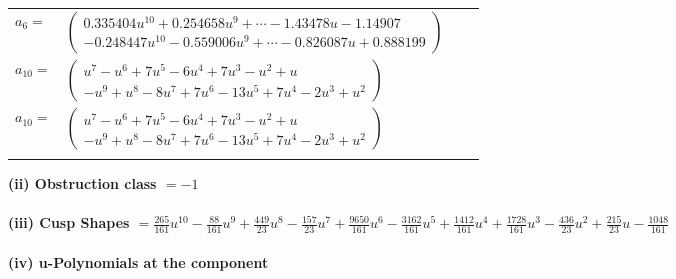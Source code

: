 \documentclass[1p]{elsarticle_modified}
\theoremstyle{definition}
\begin{document}
\begin{tabular}{m{7pt} m{180pt} m{7pt} m{180pt} }
\flushright $a_{6}=$&$\begin{pmatrix}0.335404 u^{10}+0.254658 u^{9}+\cdots-1.43478 u-1.14907\\-0.248447 u^{10}-0.559006 u^{9}+\cdots-0.826087 u+0.888199\end{pmatrix}$ \\
\flushright $a_{10}=$&$\begin{pmatrix}u^7- u^6+7 u^5-6 u^4+7 u^3- u^2+u\\- u^9+u^8-8 u^7+7 u^6-13 u^5+7 u^4-2 u^3+u^2\end{pmatrix}$\\ \flushright $a_{10}=$&$\begin{pmatrix}u^7- u^6+7 u^5-6 u^4+7 u^3- u^2+u\\- u^9+u^8-8 u^7+7 u^6-13 u^5+7 u^4-2 u^3+u^2\end{pmatrix}$\\&\end{tabular}
\flushleft \textbf{(ii) Obstruction class $= -1$}\\~\\
\flushleft \textbf{(iii) Cusp Shapes $= \frac{265}{161} u^{10}-\frac{88}{161} u^9+\frac{449}{23} u^8-\frac{157}{23} u^7+\frac{9650}{161} u^6-\frac{3162}{161} u^5+\frac{1412}{161} u^4+\frac{1728}{161} u^3-\frac{436}{23} u^2+\frac{215}{23} u-\frac{1048}{161}$}\\~\\
\newpage\renewcommand{\arraystretch}{1}
\flushleft \textbf{(iv) u-Polynomials at the component}\newline \\
\end{document}
